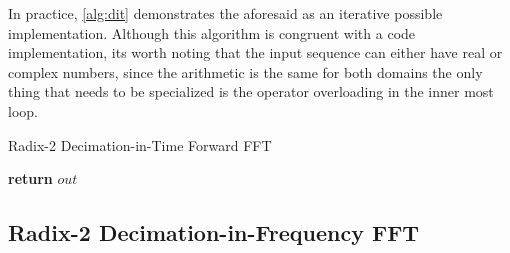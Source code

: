 \documentclass[
  oneside,
  11pt, a4paper,
  footinclude=true,
  headinclude=true,
  cleardoublepage=empty
]{scrbook}
\begin{document}


In practice, \autoref{alg:dit} demonstrates the aforesaid as an iterative possible implementation. Although this algorithm is congruent with a code implementation, its worth noting that the input sequence can either have real or complex numbers, since the arithmetic is the same for both domains the only thing that needs to be specialized is the operator overloading in the inner most loop. 
\newline

\begin{algorithm}[H]
    \caption{Radix-2 Decimation-in-Time Forward FFT} \label{alg:dit}


    \textbf{return} $out$\;
\end{algorithm}



\subsection{Radix-2 Decimation-in-Frequency FFT} \label{subsec:radix-2-dif} \label{subsec:radix-2-decimation-in-frequency-fft}
\end{document}
